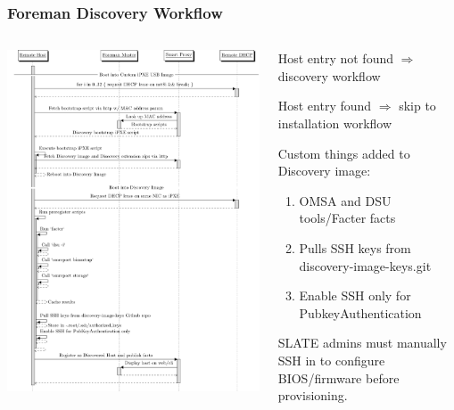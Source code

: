 \documentclass{beamer}
\begin{document}
\begin{frame}[fragile]
 \frametitle{Foreman Discovery Workflow}

 \begin{columns}
  \begin{column}{0.5\textwidth}
   \flushleft
   \includegraphics[width=\textwidth,height=\textheight-15mm,keepaspectratio]{discovery_sd}
  \end{column}

  \begin{column}{0.5\textwidth}
   \small
   Host entry not found $\Rightarrow$ discovery workflow

   Host entry found $\Rightarrow$ skip to installation workflow
   \vspace{.5cm}

   Custom things added to Discovery image:
   \begin{enumerate}
    \item OMSA and DSU tools/Facter facts
    \item Pulls SSH keys from discovery-image-keys.git
    \item Enable SSH only for PubkeyAuthentication
   \end{enumerate}

   SLATE admins must manually SSH in to configure BIOS/firmware before provisioning.

  \end{column}
 \end{columns}
\end{frame}
\end{document}
